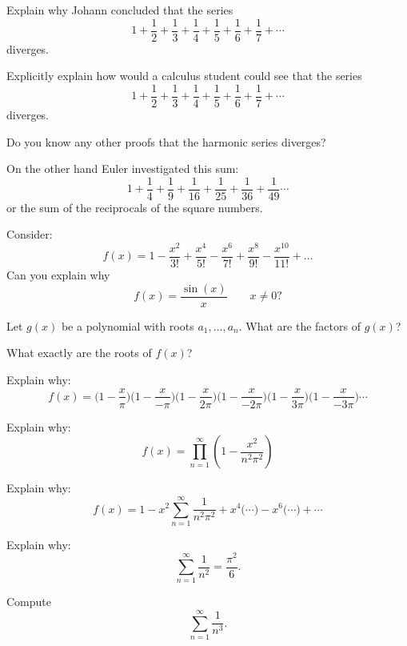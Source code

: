 \documentclass{ximera}
\begin{document}
\begin{question}
Explain why Johann concluded that the series
\[
1 + \frac{1}{2} + \frac{1}{3} + \frac{1}{4} + \frac{1}{5} + \frac{1}{6} + \frac{1}{7}+\cdots
\]
diverges. 
\end{question}


\begin{question}
Explicitly explain how would a calculus student could see that the
series
\[
1 + \frac{1}{2} + \frac{1}{3} + \frac{1}{4} + \frac{1}{5} + \frac{1}{6} + \frac{1}{7}+\cdots
\]
diverges.
\end{question}

\begin{question}
Do you know any other proofs that the harmonic series diverges?
\end{question}


On the other hand Euler investigated this sum:
\[
1 + \frac{1}{4} + \frac{1}{9} + \frac{1}{16} + \frac{1}{25} + \frac{1}{36} + \frac{1}{49}\cdots
\]
or the sum of the reciprocals of the square numbers. 


\begin{question}
Consider:
\[
f(x) = 1 - \frac{x^2}{3!} + \frac{x^4}{5!}-\frac{x^6}{7!} + \frac{x^8}{9!} - \frac{x^{10}}{11!} + \dots
\]
Can you explain why 
\[
f(x) = \frac{\sin(x)}{x}\qquad x \ne 0?
\]
\end{question}


\begin{question}
Let $g(x)$ be a polynomial with roots $a_1,\dots, a_n$. What are the factors of $g(x)$?
\end{question}

\begin{question}
What exactly are the roots of $f(x)$?
\end{question}

\begin{question}
Explain why:
\[
f(x) = \bigg(1-\frac{x}{\pi} \bigg)\bigg(1-\frac{x}{-\pi} \bigg)\bigg(1-\frac{x}{2\pi} \bigg)\bigg(1-\frac{x}{-2\pi} \bigg)\bigg(1-\frac{x}{3\pi} \bigg)\bigg(1-\frac{x}{-3\pi} \bigg) \cdots
\]
\end{question}

\begin{question}
Explain why:
\[
f(x) = \prod_{n=1}^\infty \left(1 - \frac{x^2}{n^2\pi^2} \right)
\]
\end{question}

\begin{question}
Explain why:
\[
f(x) = 1 - x^2 \sum_{n=1}^\infty \frac{1}{n^2\pi^2} 
+ x^4 \bigg(\cdots\bigg)  - x^6 \bigg(\cdots\bigg)  + \cdots
\]
\end{question}


\begin{question}
Explain why:
\[
\sum_{n=1}^\infty \frac{1}{n^2}= \frac{\pi^2}{6}.
\]
\end{question}

\begin{exploration}[Bonus!]
Compute
\[
\sum_{n=1}^\infty \frac{1}{n^3}.
\]
\end{exploration}
\end{document}
